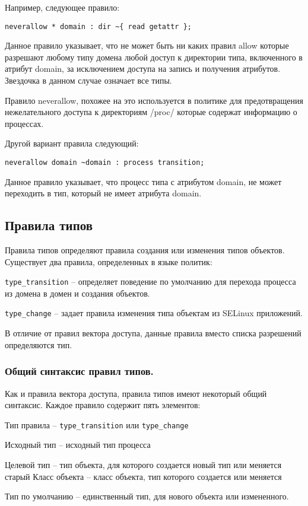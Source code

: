 \documentclass{./../class/UIR}
\begin{document}
    Например, следующее правило:
\begin{verbatim}
neverallow * domain : dir ~{ read getattr };
\end{verbatim}
    Данное правило указывает, что не может быть ни каких правил allow которые
    разрешают любому типу домена любой доступ к директории типа, включенного в
    атрибут domain, за исключением доступа на запись и получения атрибутов.
    Звездочка в данном случае означает все типы.

    Правило neverallow, похожее на это используется в политике для
    предотвращения нежелательного доступа к директориям /proc/ которые содержат
    информацию о процессах.

    Другой вариант правила следующий:
\begin{verbatim}
neverallow domain ~domain : process transition;
\end{verbatim}
    Данное правило указывает, что процесс типа с атрибутом domain, не может
    переходить в тип, который не имеет атрибута domain.

\subsection{Правила типов}

    Правила типов определяют  правила создания или изменения типов объектов.
    Существует два правила, определенных в языке политик:

    \begin{description}
      \item \verb"type_transition" – определяет поведение по умолчанию для
      перехода процесса из домена в домен и создания объектов.
      \item \verb"type_change" – задает правила изменения типа объектам из
      SELinux приложений.
    \end{description}

    В отличие от правил вектора доступа, данные правила вместо списка разрешений
    определяются тип.

\subsubsection{Общий синтаксис правил типов.}

    Как и правила вектора доступа, правила типов имеют некоторый общий
    синтаксис. Каждое правило содержит пять элементов:
    \begin{description}
      \item Тип правила – \verb"type_transition" или \verb"type_change"
      \item Исходный тип – исходный тип процесса
      \item Целевой тип – тип объекта, для которого создается новый тип или
      меняется старый Класс объекта – класс объекта, тип которого создается или
      меняется
      \item Тип по умолчанию – единственный тип, для нового объекта или
      измененного.
    \end{description}
\end{document}
